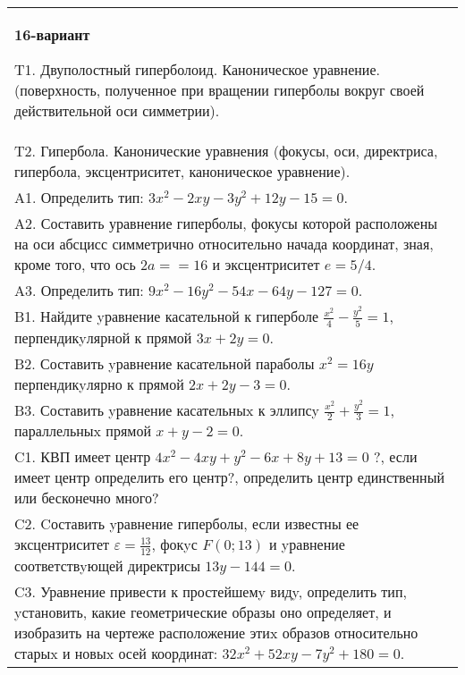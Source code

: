 \documentclass{article}
\begin{document}
\begin{tabular}{m{17cm}}
\textbf{16-вариант}
\newline

T1. Двуполостный гиперболоид. Каноническое уравнение. (поверхность, полученное при вращении гиперболы вокруг своей действительной оси симметрии).\\

T2. Гипербола. Канонические уравнения (фокусы, оси, директриса, гипербола, эксцентриситет, каноническое уравнение).\\

A1. Определить тип: $3x^{2}-2xy-3y^{2}+12y-15=0$.\\

A2. Составить уравнение гиперболы, фокусы которой расположены на оси абсцисс симметрично относительно начада координат, зная, кроме того, что ось $2a==16$ и эксцентриситет $e=5/4$.\\

A3. Определить тип: $9x^{2}-16y^{2}-54x-64y-127=0$.\\

B1. Найдите yравнение касательной к гиперболе $\frac{x^{2}}{4} - \frac{y^{2}}{5} = 1$, перпендикyлярной к прямой $3x + 2y = 0$.\\

B2. Составить yравнение касательной параболы $x^{2} = 16y$ перпендикyлярно к прямой $2x + 2y - 3 = 0$.  \\

B3. Составить yравнение касательныx к эллипсy $\frac{x^{2}}{2} + \frac{y^{2}}{3} = 1$, параллельныx прямой $x + y - 2 = 0$.  \\

C1. КВП имеет центр $4x^{2}-4xy+y^{2}-6x+8y+13=0$ ?, если имеет центр определить его центр?, определить центр единственный или бесконечно много?  \\

C2. Cоставить yравнение гиперболы, если известны ее эксцентриситет $\varepsilon=\frac{13}{12}$, фокyс $F(0;13)$ и yравнение соответствyющей директрисы $13y-144=0$.  \\

C3. Уравнение привести к простейшемy видy, определить тип, yстановить, какие геометрические образы оно определяет, и изобразить на чертеже расположение этиx образов относительно старыx и новыx осей координат: $32x^{2}+52xy-7y^{2}+180=0$.  \\

\end{tabular}
\vspace{1cm}
\end{document}
